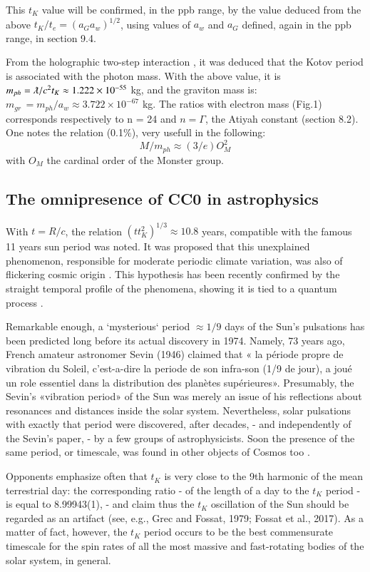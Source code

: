 \documentclass[twoside,draft]{article}
\begin{document}
\begin{sloppypar}
This $t_K$ value will be confirmed, in the ppb range, by the value deduced from the above $t_{K} /t_{e} = (a_{G} a_{w})^{1/2}$, using values of $a_{w}$ and $a_{G}$ defined, again in the ppb range, in section 9.4. 

From the holographic two-step interaction \cite{Sanchez1}, it was deduced that the Kotov period is associated with the photon mass. With the above value, it is $m_{ph} = \lambdabar/c^{2} t_{K} \approx 1.222 \times 10^{-55}$ kg, and the graviton mass is: 
$m_{gr}\, = m_{ph} /a_{w} \approx 3.722 \times 10^{-67} $ kg.
The ratios with electron mass (Fig.1) corresponds respectively to n = 24 and $n = \Gamma$, the Atiyah constant (section 8.2). One notes the relation (0.1\%), very usefull in the following:
\begin{equation}
M/m_{ph} \approx (3/e)O^2_M
\end{equation}
with $O_M$ the cardinal order of the Monster group.

\subsection{The omnipresence of CC0 in astrophysics}

With $t = R/c$, the relation $(t t_{K}^2)^{1/3} \approx 10.8$ years, compatible with the famous 11 years sun period was noted. It was proposed that this unexplained phenomenon, responsible for moderate periodic climate variation, was also of flickering cosmic origin \cite{Sanchez3}. This hypothesis has been recently confirmed by the straight temporal profile of the phenomena, showing it is tied to a quantum process \cite{Kotov2}.

Remarkable enough, a `mysterious` period $\approx 1/9$ days of the Sun's pulsations has been predicted long before its actual discovery in 1974. Namely, 73 years ago, French amateur astronomer Sevin (1946) claimed that « la p\'{e}riode propre de vibration du Soleil, c'est-a-dire la periode de son infra-son (1/9 de jour), a jou\'{e} un role essentiel dans la distribution des plan\`{e}tes sup\'{e}rieures». Presumably, the Sevin's «vibration period» of the Sun was merely an issue of his reflections about resonances and distances inside the solar system. Nevertheless, solar pulsations with exactly that period were discovered, after decades, - and independently of the Sevin's paper, - by a few groups of astrophysicists. Soon the presence of the same period, or timescale, was found in other objects of Cosmos too \cite{Kotov1}.

Opponents emphasize often that $t_{K}$ is very close to the 9th harmonic of the mean terrestrial day: the corresponding ratio - of the length of a day to the $t_{K}$ period - is equal to 8.99943(1), - and claim thus the $t_{K}$ oscillation of the Sun should be regarded as an artifact (see, e.g., Grec and Fossat, 1979; Fossat et al., 2017). As a matter of fact, however, the $t_{K}$ period occurs to be the best commensurate timescale for the spin rates of all the most massive and fast-rotating bodies of the solar system, in general.


\end{sloppypar}
\end{document}
